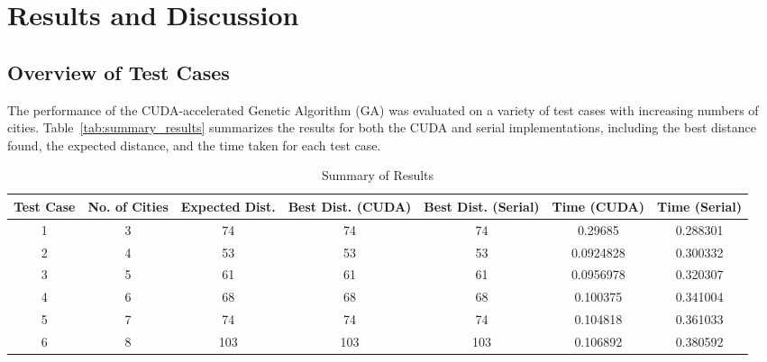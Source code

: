 \documentclass[conference]{IEEEtran}
\begin{document}
\section{Results and Discussion}
\subsection{Overview of Test Cases}

The performance of the CUDA-accelerated Genetic Algorithm (GA) was evaluated on a variety of test cases with increasing numbers of cities. Table~\ref{tab:summary_results} summarizes the results for both the CUDA and serial implementations, including the best distance found, the expected distance, and the time taken for each test case.


\begin{table*}[ht]
    \centering
    \caption{Summary of Results}
    \begin{tabular}{|c|c|c|c|c|c|c|}
        \hline
        \textbf{Test Case} & \textbf{No. of Cities} & \textbf{Expected Dist.} & \textbf{Best Dist. (CUDA)} & \textbf{Best Dist. (Serial)} & \textbf{Time (CUDA)} & \textbf{Time (Serial)} \\ \hline
        1                  & 3                      & 74                      & 74                         & 74                           & 0.29685              & 0.288301               \\ \hline
        2                  & 4                      & 53                      & 53                         & 53                           & 0.0924828            & 0.300332               \\ \hline
        3                  & 5                      & 61                      & 61                         & 61                           & 0.0956978            & 0.320307               \\ \hline
        4                  & 6                      & 68                      & 68                         & 68                           & 0.100375             & 0.341004               \\ \hline
        5                  & 7                      & 74                      & 74                         & 74                           & 0.104818             & 0.361033               \\ \hline
        6                  & 8                      & 103                     & 103                        & 103                          & 0.106892             & 0.380592               \\ \hline

\end{tabular}
\end{table*}
\end{document}
